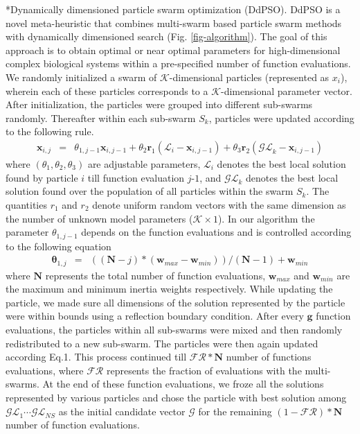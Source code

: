\documentclass[12pt]{article}
\makeatletter
\renewcommand\subsection{\@startsection
	{subsection}{2}{0mm}
	{-0.05in}
	{-0.5\baselineskip}
	{\normalfont\normalsize\bfseries}}
\makeatother
\begin{document}
\subsection*{Dynamically dimensioned particle swarm optimization (DdPSO).}
DdPSO is a novel meta-heuristic that combines multi-swarm based particle swarm methods with dynamically dimensioned search (Fig. \ref{fig-algorithm}).
The goal of this approach is to obtain optimal or near optimal parameters for high-dimensional complex biological systems within a pre-specified number of function evaluations. We randomly initialized a swarm of $\mathcal{K}$-dimensional particles (represented as ${x}_{i}$), wherein each of these particles corresponds to a $\mathcal{K}$-dimensional parameter vector. After initialization, the particles were grouped into different sub-swarms randomly. Thereafter within each sub-swarm ${S}_{k}$,  particles were updated according to the following rule.
\begin{eqnarray}
	\mathbf{x}_{i,j} &=&\theta_{1,j-1}\mathbf{x}_{i,j-1} + \theta_{2}\mathbf{r}_{1}\left(\mathcal{L}_{i} - \mathbf{x}_{i,j-1}\right) + \theta_{3}\mathbf{r}_{2}\left(\mathcal{GL}_{k} - \mathbf{x}_{i,j-1}\right)
\end{eqnarray}
where $\left(\theta_{1},\theta_{2},\theta_{3}\right)$ are adjustable parameters, $\mathcal{L}_{i}$ denotes the best local solution found by particle $i$ till function evaluation $j$-$1$, and
$\mathcal{GL}_{k}$ denotes the best local solution found over the population of all particles within the swarm ${S}_{k}$. The quantities $r_{1}$ and $r_{2}$ denote uniform random vectors with the same dimension as the number of unknown model
parameters ($\mathcal{K}\times{1}$). In our algorithm the parameter $\theta_{1,j-1}$ depends on the function evaluations and is controlled according to the following equation
\begin{eqnarray}
	\mathbf \theta_{1,j}&=&((\mathbf{N}-{j})*(\mathbf{w}_{max}-\mathbf{w}_{min}))/(\mathbf{N}-{1}) + \mathbf{w}_{min}
\end{eqnarray}
where $\mathbf{N}$ represents the total number of function evaluations, $\mathbf{w}_{max}$ and $\mathbf{w}_{min}$ are the maximum and minimum inertia weights respectively. While updating the particle, we made sure all dimensions of the solution represented by the particle were within bounds using a reflection boundary condition. After every $\mathbf{g}$  function evaluations, the particles within all sub-swarms were mixed and then randomly redistributed to a new sub-swarm. The particles were then again updated according Eq.1. This process continued till $\mathcal{FR}*\mathbf{N}$ number of functions evaluations, where $\mathcal{FR}$ represents the fraction of evaluations with the multi-swarms. At the end of these function evaluations, we froze all the solutions represented by various particles and chose the particle with best solution among $\mathcal{GL}_{1} \cdots \mathcal{GL}_{NS}$ as the initial candidate vector $\mathcal{G}$ for the remaining $({1}-\mathcal{FR})*\mathbf{N}$ number of function evaluations.
\end{document}

